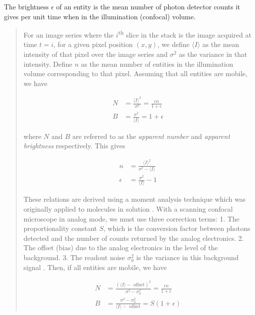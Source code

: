 \documentclass[12pt,]{book}
\theoremstyle{definition}
\theoremstyle{definition}
\theoremstyle{definition}
\theoremstyle{remark}
\let\BeginKnitrBlock\begin \let\EndKnitrBlock\end
\begin{document}
\BeginKnitrBlock{definition}
\protect\hypertarget{def:unnamed-chunk-14}{}{\label{def:unnamed-chunk-14}
}The brightness \(\epsilon\) of an entity is the mean number of photon
detector counts it gives per unit time when in the illumination
(confocal) volume.
\EndKnitrBlock{definition}

\begin{quote}
For an image series where the \(i\)\textsuperscript{th} slice in the
stack is the image acquired at time \(t = i\), for a given pixel
position \((x, y)\), we define \(\langle I \rangle\) as the mean
intensity of that pixel over the image series and \(\sigma^2\) as the
variance in that intensity. Define \(n\) as the mean number of entities
in the illumination volume corresponding to that pixel. Assuming that
all entities are mobile, we have

\begin{align}
N &= \frac{\langle I \rangle^2}{\sigma^2} = \frac{\epsilon n}{1 + \epsilon} \label{eq:NB1-1} \\
B &= \frac{\sigma^2}{\langle I \rangle} = 1 + \epsilon \label{eq:NB1-2}
\end{align}

where \(N\) and \(B\) are referred to as the \emph{apparent number} and
\emph{apparent brightness} respectively. This gives

\begin{align}
n &= \frac{\langle I \rangle^2}{\sigma^2 - \langle I \rangle} \label{eq:NB2-2} \\
\epsilon &= \frac{\sigma^2}{\langle I \rangle} - 1 \label{eq:NB2-1}
\end{align}

These relations are derived using a moment analysis technique which was
originally applied to molecules in solution \citep{QianElson}. With a
scanning confocal microscope in analog mode, we must use three
correction terms: 1. The proportionality constant \(S\), which is the
conversion factor between photons detected and the number of counts
returned by the analog electronics. 2. The offset (bias) due to the
analog electronics in the level of the background. 3. The readout noise
\(\sigma_0^2\) is the variance in this background signal \citep{Dalal}.
Then, if all entities are mobile, we have

\begin{align}
N &= \frac{(\langle I \rangle - \text{ offset})^2}{\sigma^2 - \sigma_0^2} = \frac{\epsilon n}{1 + \epsilon} \label{eq:NBa1-1} \\
B &= \frac{\sigma^2 - \sigma_0^2}{\langle I \rangle - \text{ offset}} = S(1 + \epsilon) \label{eq:NBa1-2}
\end{align}


\end{quote}
\end{document}
